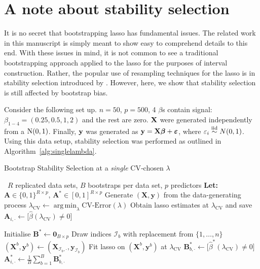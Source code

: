 \clearpage
\section{A note about stability selection}
\label{sec:stability}

It is no secret that bootstrapping lasso has fundamental issues. The related work in this manuscript is simply meant to show easy to comprehend details to this end. With these issues in mind, it is not common to see a traditional bootstrapping approach applied to the lasso for the purposes of interval construction. Rather, the popular use of resampling techniques for the lasso is in stability selection introduced by  \cite{Meinshausen2010}. However, here, we show that stability selection is still affected by bootstrap bias.

Consider the following set up. $n = 50$, $p = 500$, 4 $\beta$s contain signal: $\beta_{1-4} = (0.25, 0.5, 1, 2)$ and the rest are zero. $\mathbf{X}$ were generated independently from a $\textrm{N}(0, 1)$. Finally, $\mathbf{y}$ was generated as $\mathbf{y} = \mathbf{X}\boldsymbol{\beta} + \boldsymbol{\varepsilon}$, where $\varepsilon_i \overset{\text{iid}}{\sim} N(0, 1)$. Using this data setup, stability selection was performed as outlined in Algorithm~\ref{alg:singlelambda}.

\begin{algorithm}[!ht]
\caption{Bootstrap Stability Selection at a \emph{single} CV‐chosen $\lambda$}
\label{alg:singlelambda}
\begin{algorithmic}[1]
\Require\ $R$ replicated data sets, $B$ bootstraps per data set,
          $p$ predictors
\Statex \textbf{Let:}
  $\mathbf A \in\{0,1\}^{R\times p}$, $\mathbf A^{\!*}\in[0,1]^{R\times p}$
%
  \State Generate $(\mathbf X,\mathbf y)$ from the data-generating process
  \State $\lambda_{\text{CV}}\leftarrow
         \operatorname*{arg\,min}_{\lambda}\text{CV‐Error}(\lambda)$
  \State Obtain lasso estimates at $\lambda_{\text{CV}}$
        and save
        $\mathbf A_{i,\cdot}\gets\bigl[\hat\beta(\lambda_{\text{CV}})\neq 0\bigr]$

  \State Initialise $\mathbf B^{\!*}\gets\mathbf 0_{B\times p}$
                          
     \State Draw indices $\mathcal I_b$ with replacement from $\{1,\dots,n\}$
     \State $(\mathbf X^{b},\mathbf y^{b})\gets
            (\mathbf X_{\mathcal I_b,\cdot},\mathbf y_{\mathcal I_b})$
     \State Fit lasso on $(\mathbf X^{b},\mathbf y^{b})$ at $\lambda_{\text{CV}}$
     \State $\mathbf B^{\!*}_{b,\cdot}\gets
            \bigl[\hat\beta^{\!*}(\lambda_{\text{CV}})\neq 0\bigr]$
  \EndFor
  \State $\mathbf A^{\!*}_{i,\cdot}\gets
         \tfrac1B\sum_{b=1}^{B}\mathbf B^{\!*}_{b,\cdot}$
\EndFor
\end{algorithmic}
\end{algorithm}

